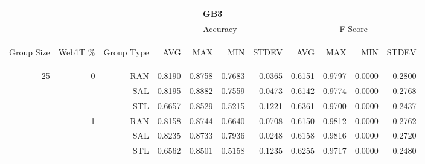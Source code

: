 \begin{center}
\begin{table}[htbp] 
 \begin{center}
\begin{tabular}{ | r | r | r | r | r | r | r | r | r | r | r |}
\hline
\multicolumn{11}{|c|}{GB3}\\
\hline
 & & & \multicolumn{4}{|c|}{Accuracy} & \multicolumn{4}{|c|}{F-Score}\\ \cline{4-11}
\begin{sideways}Group Size\end{sideways} & \begin{sideways}Web1T \%\end{sideways} & \begin{sideways}Group Type\end{sideways} & \begin{sideways}AVG\end{sideways} & \begin{sideways}MAX\end{sideways} & \begin{sideways}MIN\end{sideways} & \begin{sideways}STDEV\end{sideways} & \begin{sideways}AVG\end{sideways} & \begin{sideways}MAX\end{sideways} & \begin{sideways}MIN\end{sideways} & \begin{sideways}STDEV\end{sideways}\\
\hline
\multirow{15}{*}{25}
 & \multirow{3}{*}{0} & RAN & 0.8190 & 0.8758 & 0.7683 & 0.0365 & 0.6151 & 0.9797 & 0.0000 & 0.2800\\ \cline{3-11}
 &   & SAL & 0.8195 & 0.8882 & 0.7559 & 0.0473 & 0.6142 & 0.9774 & 0.0000 & 0.2768\\ \cline{3-11}
 &   & STL & 0.6657 & 0.8529 & 0.5215 & 0.1221 & 0.6361 & 0.9700 & 0.0000 & 0.2437\\ \cline{2-11}
 & \multirow{3}{*}{1} & RAN & 0.8158 & 0.8744 & 0.6640 & 0.0708 & 0.6150 & 0.9812 & 0.0000 & 0.2762\\ \cline{3-11}
 &   & SAL & 0.8235 & 0.8733 & 0.7936 & 0.0248 & 0.6158 & 0.9816 & 0.0000 & 0.2720\\ \cline{3-11}
 &   & STL & 0.6562 & 0.8501 & 0.5158 & 0.1235 & 0.6255 & 0.9717 & 0.0000 & 0.2480\\ \cline{2-11}

\end{tabular}
\end{center}
\end{table}
\end{center}
